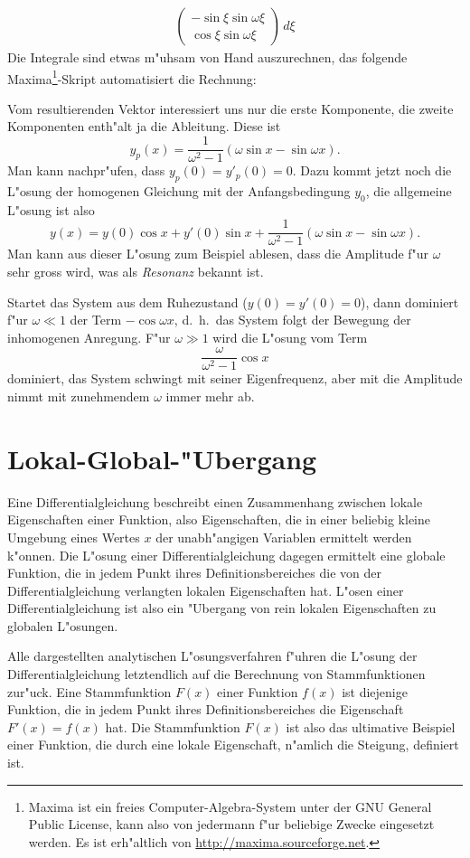 \begin{beispiel}
\begin{align*}
\begin{pmatrix}
-\sin \xi\sin\omega\xi\\
 \cos \xi\sin\omega\xi
\end{pmatrix}
\,d\xi
\end{align*}
Die Integrale sind etwas m"uhsam von Hand auszurechnen, das folgende
Maxima\footnote{Maxima ist ein freies Computer-Algebra-System unter der
GNU General Public License, kann also von jedermann f"ur beliebige
Zwecke eingesetzt werden. Es ist erh"altlich von
\url{http://maxima.sourceforge.net}.}-Skript automatisiert
die Rechnung:

Vom resultierenden Vektor interessiert uns nur die erste Komponente,
die zweite Komponenten enth"alt ja die Ableitung.
Diese ist
\[
y_p(x)=\frac1{\omega^2-1}(\omega\sin x-\sin\omega x).
\]
Man kann nachpr"ufen, dass $y_p(0)=y'_p(0)=0$.
Dazu kommt jetzt noch die L"osung der homogenen Gleichung mit der
Anfangsbedingung $y_0$, die allgemeine L"osung ist also
\[
y(x)=y(0) \cos x +y'(0)\sin x+\frac1{\omega^2-1}(\omega\sin x -\sin\omega x).
\]
Man kann aus dieser L"osung zum Beispiel ablesen, dass die Amplitude
f"ur $\omega$ sehr gross wird, was als {\em Resonanz} bekannt ist.

Startet das System aus dem Ruhezustand ($y(0)=y'(0)=0$), dann dominiert
f"ur $\omega\ll 1$ der Term $-\cos\omega x$, d.~h.~das System folgt der
Bewegung der inhomogenen Anregung.
F"ur $\omega \gg 1$ wird die L"osung vom Term
\[
\frac{\omega}{\omega^2-1}\cos x
\]
dominiert, das System schwingt mit seiner Eigenfrequenz, aber mit die
Amplitude nimmt mit zunehmendem $\omega$ immer mehr ab.
\end{beispiel}

\section{Lokal-Global-"Ubergang}
Eine Differentialgleichung beschreibt einen Zusammenhang zwischen
lokale Eigenschaften einer Funktion, also Eigenschaften, die in einer
beliebig kleine Umgebung eines Wertes $x$ der unabh"angigen Variablen
ermittelt werden k"onnen.
Die L"osung einer Differentialgleichung dagegen ermittelt eine globale
Funktion, die in jedem Punkt ihres Definitionsbereiches die von der
Differentialgleichung verlangten lokalen Eigenschaften hat.
L"osen einer Differentialgleichung ist also ein "Ubergang von rein lokalen
Eigenschaften zu globalen L"osungen.

Alle dargestellten analytischen L"osungsverfahren f"uhren die L"osung
der Differentialgleichung letztendlich auf die Berechnung von Stammfunktionen
zur"uck.
Eine Stammfunktion $F(x)$ einer Funktion $f(x)$ ist diejenige Funktion,
die in jedem Punkt ihres Definitionsbereiches die Eigenschaft $F'(x)=f(x)$
hat.
Die Stammfunktion $F(x)$ ist also das ultimative Beispiel einer Funktion,
die durch eine lokale Eigenschaft, n"amlich die Steigung, definiert ist.

